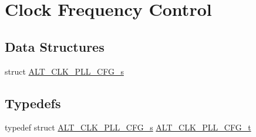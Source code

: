 \hypertarget{group__CLK__MGR__FREQ}{}\section{Clock Frequency Control}
\label{group__CLK__MGR__FREQ}
\subsection*{Data Structures}
\begin{DoxyCompactItemize}
\item 
struct \mbox{\hyperlink{structALT__CLK__PLL__CFG__s}{A\+L\+T\+\_\+\+C\+L\+K\+\_\+\+P\+L\+L\+\_\+\+C\+F\+G\+\_\+s}}
\end{DoxyCompactItemize}
\subsection*{Typedefs}
\begin{DoxyCompactItemize}
\item 
typedef struct \mbox{\hyperlink{structALT__CLK__PLL__CFG__s}{A\+L\+T\+\_\+\+C\+L\+K\+\_\+\+P\+L\+L\+\_\+\+C\+F\+G\+\_\+s}} \mbox{\hyperlink{group__CLK__MGR__FREQ_ga4224be84fafb79818ab3736b39ad730a}{A\+L\+T\+\_\+\+C\+L\+K\+\_\+\+P\+L\+L\+\_\+\+C\+F\+G\+\_\+t}}
\end{DoxyCompactItemize}
